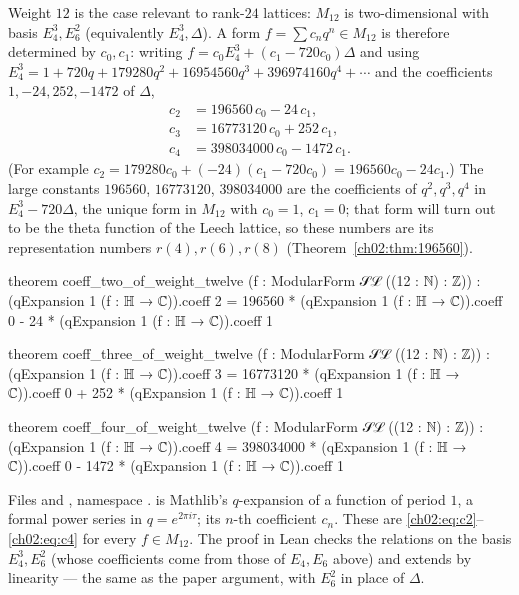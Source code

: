 Weight $12$ is the case relevant to rank-$24$ lattices: $M_{12}$ is two-dimensional with basis
$E_4^3,E_6^2$ (equivalently $E_4^3,\Delta$).  A form $f=\sum c_nq^n\in M_{12}$ is therefore
determined by $c_0,c_1$: writing $f=c_0E_4^3+(c_1-720c_0)\Delta$ and using
$E_4^3=1+720q+179280q^2+16954560q^3+396974160q^4+\cdots$ and the coefficients
$1,-24,252,-1472$ of $\Delta$,
\begin{align}
c_2&=196560\,c_0-24\,c_1,\label{ch02:eq:c2}\\
c_3&=16773120\,c_0+252\,c_1,\label{ch02:eq:c3}\\
c_4&=398034000\,c_0-1472\,c_1.\label{ch02:eq:c4}
\end{align}
(For example $c_2=179280c_0+(-24)(c_1-720c_0)=196560c_0-24c_1$.)  The large constants
$196560$, $16773120$, $398034000$ are the coefficients of $q^2,q^3,q^4$ in $E_4^3-720\Delta$, the
unique form in $M_{12}$ with $c_0=1$, $c_1=0$; that form will turn out to be the theta function
of the Leech lattice, so these numbers are its representation numbers $r(4),r(6),r(8)$
(Theorem~\ref{ch02:thm:196560}).

\begin{leancode}
theorem coeff_two_of_weight_twelve (f : ModularForm 𝒮ℒ ((12 : ℕ) : ℤ)) :
    (qExpansion 1 (f : ℍ → ℂ)).coeff 2
      = 196560 * (qExpansion 1 (f : ℍ → ℂ)).coeff 0
        - 24 * (qExpansion 1 (f : ℍ → ℂ)).coeff 1

theorem coeff_three_of_weight_twelve (f : ModularForm 𝒮ℒ ((12 : ℕ) : ℤ)) :
    (qExpansion 1 (f : ℍ → ℂ)).coeff 3
      = 16773120 * (qExpansion 1 (f : ℍ → ℂ)).coeff 0
        + 252 * (qExpansion 1 (f : ℍ → ℂ)).coeff 1

theorem coeff_four_of_weight_twelve (f : ModularForm 𝒮ℒ ((12 : ℕ) : ℤ)) :
    (qExpansion 1 (f : ℍ → ℂ)).coeff 4
      = 398034000 * (qExpansion 1 (f : ℍ → ℂ)).coeff 0
        - 1472 * (qExpansion 1 (f : ℍ → ℂ)).coeff 1
\end{leancode}
\begin{dictionary}
Files  and , namespace
.   is Mathlib's $q$-expansion of a function of period $1$,
a formal power series in $q=e^{2\pi i\tau}$;  its $n$-th coefficient $c_n$.  These
are \eqref{ch02:eq:c2}--\eqref{ch02:eq:c4} for every $f\in M_{12}$.  The proof in Lean checks the
relations on the basis $E_4^3,E_6^2$ (whose coefficients come from those of $E_4,E_6$ above) and
extends by linearity --- the same as the paper argument, with $E_6^2$ in place of $\Delta$.
\end{dictionary}

